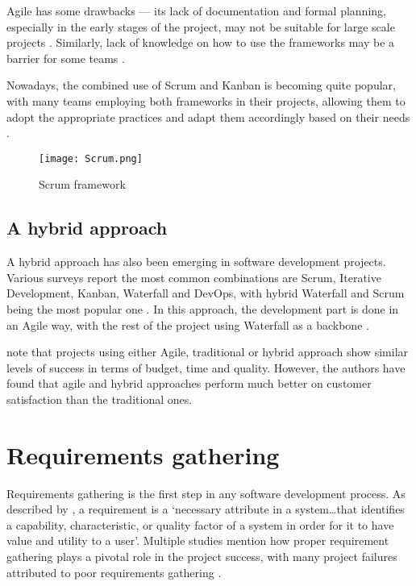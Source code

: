 Agile has some drawbacks --- its lack of documentation and formal planning, especially in the early stages of the project, may not be suitable for large scale projects \parencite{agile, sdlc2}. Similarly, lack of knowledge on how to use the frameworks may be a barrier for some teams \parencite{waterfallno, sdlc2}.

Nowadays, the combined use of Scrum and Kanban is becoming quite popular, with many teams employing both frameworks in their projects, allowing them to adopt the appropriate practices and adapt them accordingly based on their needs \parencite{scrumban}.

\begin{figure}[ht]
    \centering
    \texttt{[image: Scrum.png]}
    \caption{Scrum framework}\label{fig:scrum}
\end{figure}

\subsection{A hybrid approach}

A hybrid approach has also been emerging in software development projects. Various surveys report the most common combinations are Scrum, Iterative Development, Kanban, Waterfall and DevOps, with hybrid Waterfall and Scrum being the most popular one \parencite{hybrid1,hybrid2}. In this approach, the development part is done in an Agile way, with the rest of the project using Waterfall as a backbone \parencite{hybrid2}.

\textcite{hybrid1} note that projects using either Agile, traditional or hybrid approach show similar levels of success in terms of budget, time and quality. However, the authors have found that agile and hybrid approaches perform much better on customer satisfaction than the traditional ones.

\section{Requirements gathering}

Requirements gathering is the first step in any software development process. As described by \textcite{reqanalysis2}, a requirement is a `necessary attribute in a system\ldots that identifies a capability, characteristic, or quality factor of a system in order for it to have value and utility to a user'. Multiple studies mention how proper requirement gathering plays a pivotal role in the project success, with many project failures attributed to poor requirements gathering \parencite{reqanalysis1, reqanalysis3, reqanalysis5}.

